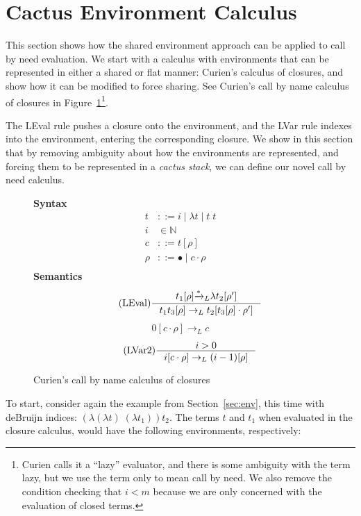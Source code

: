 \section{Cactus Environment Calculus} \label{sec:calc}

This section shows how the shared environment approach can be applied to
call by need evaluation. We start with a calculus with environments that can be
represented in either a shared or flat manner: Curien's calculus of closures,
and show how it can be modified to force sharing. See Curien's call by name
calculus of closures in Figure~\ref{fig:calcclos}\footnote{Curien calls it a
``lazy'' evaluator, and there is some ambiguity with the term lazy, but we use the
term only to mean call by need. We also remove the condition checking that $i <
m$ because we are only concerned with the evaluation of closed terms.}.

The LEval rule pushes a closure onto the environment, and the LVar rule indexes
into the environment, entering the corresponding closure. We show in this
section that by removing ambiguity about how the environments are represented,
and forcing them to be represented in a \emph{cactus stack}, we can define our
novel call by need calculus.

\begin{figure}
\textbf{Syntax}
\begin{align*}
\tag{Term} t &::= i \; | \; \lambda t \; | \; t \; t  \\
\tag{Variable} i &\in \mathbb{N}  \\
\tag{Closure} c &::= t [\rho] \\
\tag{Environment} \rho &::= \bullet \; | \; c \cdot \rho \\
\end{align*}
\textbf{Semantics}
\begin{align*}
\tag{LEval}\inference
{t_1[\rho] {\xrightarrow{* }}_L \lambda t_2[\rho'] }
{t_1 t_3[\rho] \rightarrow_L t_2[t_3[\rho] \cdot \rho'] } 
\end{align*}
\begin{align*}
\tag{LVar1} 0[c \cdot \rho] \rightarrow_L c
\end{align*}
\begin{align*}
\tag{LVar2} \inference
{i > 0}
{i[c \cdot \rho] \rightarrow_L (i-1)[\rho]}
\end{align*}
\caption{Curien's call by name calculus of closures}
\label{fig:calcclos}
\end{figure}

To start, consider again the example from Section~\ref{sec:env}, this
time with deBruijn indices: $(\lambda(\lambda t) \; (\lambda t_1)) t_2$.  The
terms $t$ and $t_1$ when evaluated in the closure calculus, would have the
following environments, respectively: 

